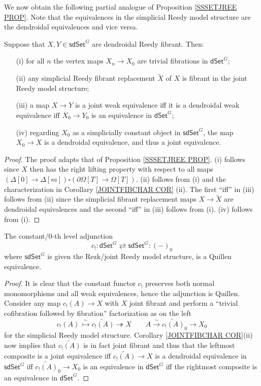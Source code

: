 \documentclass[a4paper,10pt
,draft
]{article}%
\begin{document}
We now obtain the following partial analogue of Proposition \ref{SSSETJREE PROP}. Note that the equivalences in the simplicial Reedy model structure are the dendroidal equivalences and vice versa.


\begin{corollary}\label{SDSETG COR}
	Suppose that $X, Y \in \mathsf{sdSet}^G$ are dendroidal Reedy fibrant. Then:
\begin{itemize}
	\item[(i)] for all $n$ the vertex maps $X_{n} \to X_{0}$ are trivial fibrations in $\mathsf{dSet}^G$;
	\item[(ii)] any simplicial Reedy fibrant replacement $\tilde{X}$ of $X$ is fibrant in the joint Reedy model structure;
	\item[(iii)] a map $X \to Y$ is a joint weak equivalence
	iff it is a dendroidal weak equivalence iff 
	$X_0 \to Y_0$ is an equivalence in $\mathsf{dSet}^G$;
	\item[(iv)] regarding $X_0$ as a simplicially constant object in $\mathsf{sdSet}^G$, the map $X_0 \to X$ is a dendroidal equivalence, and thus a joint equivalence. 
\end{itemize}
\end{corollary}

\begin{proof}
	The proof adapts that of Proposition \ref{SSSETJREE PROP}.
	(i) follows since $X$ then has the right lifting property with respect to all maps 
	$(\Delta[0] \to \Delta[m]) \square (\partial \Omega[T] \to \Omega[T])$. (ii) follows from (i) and the characterization in  Corollary \ref{JOINTFIBCHAR COR} (ii). The first ``iff'' in (iii) follows from (ii) since the simplicial fibrant replacement maps 
	$X \to \tilde{X}$ are dendroidal equivalences
	and the second ``iff'' in (iii) follows from (i).
	(iv) follows from (i).
\end{proof}

\begin{theorem}\label{INC0AGJ THM}
	The constant/$0$-th level adjunction
	\[
	c_!\colon 
	\mathsf{dSet}^G \rightleftarrows \mathsf{sdSet}^G
	\colon (-)_0
	\]
	where $\mathsf{sdSet}^G$ is given the Rezk/joint Reedy model structure,
	is a Quillen equivalence.
\end{theorem}

\begin{proof}
	It is clear that the constant functor $c_!$ preserves both normal monomorphisms and all weak equivalences, hence the adjunction is Quillen. 
	Consider any map $c_!(A) \to X$ with $X$ joint fibrant and perform a ``trivial cofibration followed by fibration'' factorization as on the left
\[
c_!(A) \overset{\sim}{\rightarrowtail} \widetilde{c_!(A)} \twoheadrightarrow X
	\qquad
A \xrightarrow{\sim} \widetilde{c_!(A)}_0 \to X_0
\]
	for the simplicial Reedy model structure. 
	Corollary \ref{JOINTFIBCHAR COR}(ii) now implies that 
	$\widetilde{c_!(A)}$ is in fact joint fibrant
	and thus that the leftmost composite is a joint equivalence iff $\widetilde{c_!(A)} \to X$ is a dendroidal equivalence in $\mathsf{sdSet}^G$ iff $\widetilde{c_!(A)}_0 \to X_0$ is an equivalence in  $\mathsf{dSet}^G$ iff the rightmost composite is an equivalence in $\mathsf{dSet}^G$.
\end{proof}
\end{document}
